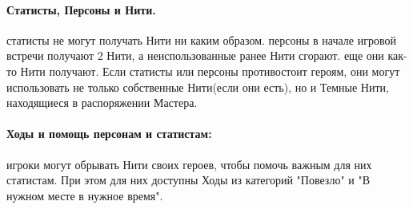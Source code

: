
\paragraph{Статисты, Персоны и Нити.}
статисты не могут получать Нити ни каким образом.\tbd
персоны в начале игровой встречи получают 2 Нити, а неиспользованные ранее Нити сгорают.\tbd
еще они как-то Нити получают.\tbd
Если статисты или персоны противостоит героям, они могут использовать не только собственные Нити(если они есть), но и Темные Нити, находящиеся в распоряжении Мастера.\tbd
\paragraph{Ходы и помощь персонам и статистам:} игроки могут обрывать Нити своих героев, чтобы помочь важным для них статистам. При этом для них доступны Ходы из категорий "Повезло" и "В нужном месте в нужное время".


